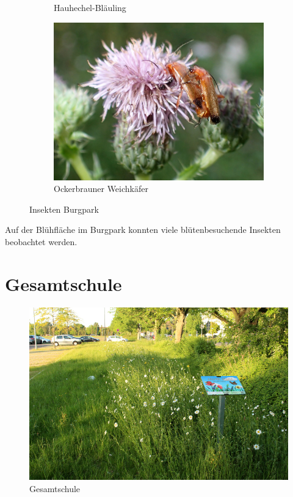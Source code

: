 \documentclass[10pt]{article}
\begin{document}
\begin{figure}[h!]
\begin{subfigure}[b]{0.48\linewidth}
    \caption{Hauhechel-Bläuling}
  \end{subfigure}
  \begin{subfigure}[b]{0.43\linewidth}
    \includegraphics[width=\linewidth]{img/weichkaefer.jpg}
    \caption{Ockerbrauner Weichkäfer}
  \end{subfigure}
  \caption{Insekten Burgpark}
\end{figure}

Auf der Blühfläche im Burgpark konnten viele blütenbesuchende Insekten beobachtet werden.

\newpage
\section{Gesamtschule}
\begin{figure}[h!]
  \includegraphics[width=\linewidth]{img/gesamtschule/mai.jpg}
  \caption{Gesamtschule}
\end{figure}
\end{document}
